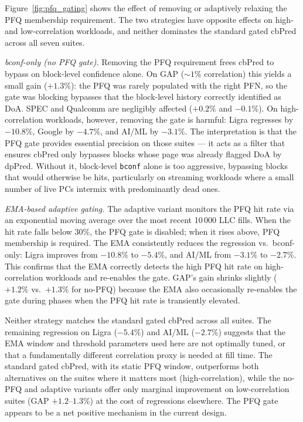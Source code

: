 \documentclass[12pt]{article}
\begin{document}
Figure~\ref{fig:pfq_gating} shows the effect of removing or adaptively
relaxing the PFQ membership requirement.
The two strategies have opposite effects on high- and low-correlation
workloads, and neither dominates the standard gated cbPred across all
seven suites.

\emph{bconf-only (no PFQ gate).}
Removing the PFQ requirement frees cbPred to bypass on block-level
confidence alone.
On GAP (${\sim}1\%$ correlation) this yields a small gain
($+1.3\%$): the PFQ was rarely populated with the right PFN, so the gate
was blocking bypasses that the block-level history correctly identified as
DoA.
SPEC and Qualcomm are negligibly affected ($+0.2\%$ and $-0.1\%$).
On high-correlation workloads, however, removing the gate is harmful:
Ligra regresses by $-10.8\%$, Google by $-4.7\%$, and AI/ML by $-3.1\%$.
The interpretation is that the PFQ gate provides essential precision on
those suites --- it acts as a filter that ensures cbPred only bypasses
blocks whose page was already flagged DoA by dpPred.
Without it, block-level \texttt{bconf} alone is too aggressive, bypassing
blocks that would otherwise be hits, particularly on streaming workloads
where a small number of live PCs intermix with predominantly dead ones.

\emph{EMA-based adaptive gating.}
The adaptive variant monitors the PFQ hit rate via an exponential moving
average over the most recent 10\,000 LLC fills.
When the hit rate falls below 30\%, the PFQ gate is disabled; when it
rises above, PFQ membership is required.
The EMA consistently reduces the regression vs.\ bconf-only: Ligra
improves from $-10.8\%$ to $-5.4\%$, and AI/ML from $-3.1\%$ to
$-2.7\%$.
This confirms that the EMA correctly detects the high PFQ hit rate on
high-correlation workloads and re-enables the gate.
GAP's gain shrinks slightly ($+1.2\%$ vs.\ $+1.3\%$ for no-PFQ) because
the EMA also occasionally re-enables the gate during phases when the PFQ
hit rate is transiently elevated.

Neither strategy matches the standard gated cbPred across all suites.
The remaining regression on Ligra ($-5.4\%$) and AI/ML ($-2.7\%$)
suggests that the EMA window and threshold parameters used here are not
optimally tuned, or that a fundamentally different correlation proxy is
needed at fill time.
The standard gated cbPred, with its static PFQ window, outperforms both
alternatives on the suites where it matters most (high-correlation), while
the no-PFQ and adaptive variants offer only marginal improvement on
low-correlation suites (GAP $+1.2$--$1.3\%$) at the cost of regressions
elsewhere.
The PFQ gate appears to be a net positive mechanism in the current design.
\end{document}
